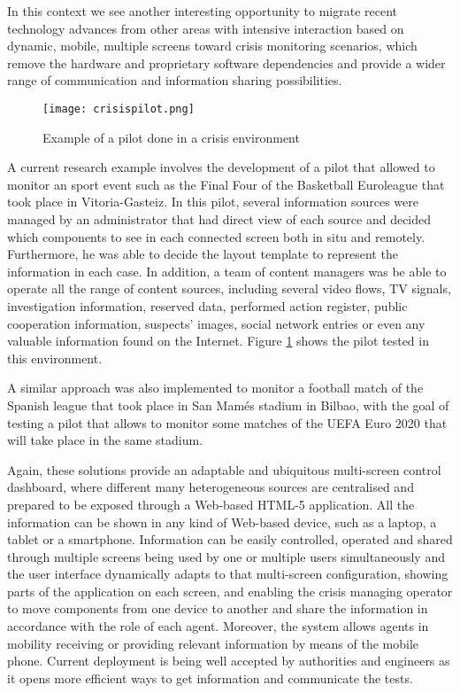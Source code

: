 In this context we see another interesting opportunity to migrate recent technology advances from other areas with intensive interaction based on dynamic, mobile, multiple screens toward crisis monitoring scenarios, which remove the hardware and proprietary software dependencies and provide a wider range of communication and information sharing possibilities. 


\begin{figure}
	\begin{center}
		\texttt{[image: crisispilot.png]}
		\caption{Example of a pilot done in a crisis environment}
		\label{fig:cripilot}
	\end{center}
\end{figure}

A current research example involves the development of a pilot that allowed to monitor an sport event such as the Final Four of the Basketball Euroleague that took place in Vitoria-Gasteiz. In this pilot, several information sources were managed by an administrator that had direct view of each source and decided which components to see in each connected screen both in situ and remotely. Furthermore, he was able to decide the layout template to represent the information in each case.
In addition, a team of content managers was be able to operate all the range of content sources, including several video flows, TV signals, investigation information, reserved data, performed action register, public cooperation information, suspects' images, social network entries or even any valuable information found on the Internet. Figure \ref{fig:cripilot} shows the pilot tested in this environment. 

A similar approach was also implemented to monitor a football match of the Spanish league that took place in San Mamés stadium in Bilbao, with the goal of testing a pilot that allows to monitor some matches of the UEFA Euro 2020 that will take place in the same stadium. 

Again, these solutions provide an adaptable and ubiquitous multi-screen control dashboard, where different many heterogeneous sources are centralised and prepared to be exposed through a
Web-based HTML-5 application. All the information can be shown in any kind of Web-based device, such as a laptop, a tablet or a smartphone. Information can be easily controlled, operated and shared through multiple screens being used by one or multiple users simultaneously and the user interface dynamically adapts to that multi-screen configuration, showing parts of the application on each screen, and enabling the crisis managing operator to move components from one device to another and share the information in accordance with the role of each agent. Moreover, the system allows agents in mobility receiving or providing relevant information by means of the mobile phone. Current deployment is being well accepted by authorities and engineers as it opens more efficient ways to get information and communicate the tests.

